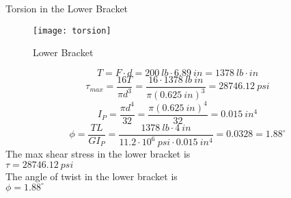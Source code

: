\documentclass[hidelinks,12pt]{article}
\begin{document}

\begin{center}
\large Torsion in the Lower Bracket
\end{center}
\flushleft
\begin{figure}[!htb]
  \center
  \texttt{[image: torsion]}
  \caption{Lower Bracket}
  \label{}
\end{figure}
\begin{equation}
  T = F \cdot d = 200~lb \cdot 6.89~in = 1378~lb \cdot in
\end{equation}
\begin{equation}
  \tau_{max} = \frac{16T}{\pi d^3} = \frac{16 \cdot 1378~lb~in}{\pi(0.625~in)^3} = 28746.12~psi
\end{equation}
\begin{equation}
  I_P = \frac{\pi d^4}{32} = \frac{\pi(0.625~in)^4}{32} = 0.015~in^4
\end{equation}
\begin{equation}
  \phi = \frac{TL}{GI_P} = \frac{1378~lb \cdot 4~in}{11.2 \cdot 10^6~psi \cdot 0.015~in^4} = 0.0328 = 1.88^\circ
\end{equation}
\vspace{5px}
The max shear stress in the lower bracket is\\
$\tau = 28746.12~psi$\\
\vspace{5px}
The angle of twist in the lower bracket is\\
$\phi = 1.88^\circ$
\end{document}
